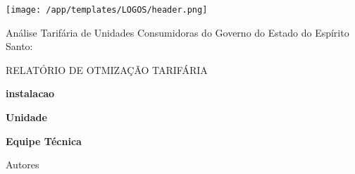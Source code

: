 \documentclass[a4paper,12pt]{abntex2}
\renewcommand{\arraystretch}{1.3}
\begin{document}
\cleardoublepage

    \thispagestyle{empty}
    \vspace*{-2.5cm}
    \begin{center}
        \texttt{[image: /app/templates/LOGOS/header.png]}
        \vspace{1cm}
    
        \noindent

        \Large{Análise Tarifária de Unidades Consumidoras do Governo do Estado do Espírito Santo:}

        \vspace{2.0cm}
    
        \large{RELATÓRIO DE OTMIZAÇÃO TARIFÁRIA}

        \vspace{1.0cm}

        \textbf{ {{ instalacao }} }

        \vspace{1.0cm}

        \textbf{ {{ Unidade }} }

        \vspace{1.5cm}
        
        \textbf{Equipe Técnica}

        \small{ {{ Autores }} }
    \end{center}  
    
    \vspace{2cm}

    \noindent

    \begin{table}[!ht]
        \centering
        \setlength{\tabcolsep}{5pt}
        \renewcommand{\arraystretch}{1.3}
    \end{table} 
    \vfill
    
\end{document}
